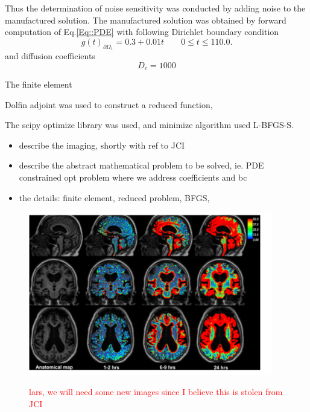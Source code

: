 \documentclass[11pt,a4paper]{article}
\renewcommand{\comment}[1]{\textcolor{red}{#1}}
\begin{document}
Thus the determination of noise sensitivity was conducted by adding noise to the manufactured solution. The manufactured solution was obtained by forward computation of Eq.\ref{Eq::PDE} with following Dirichlet boundary condition
\begin{equation}
g(t)_{\partial \Omega_1} = 0.3 + 0.01t  \qquad  0 \leq t \leq 110.0.
\end{equation}
and diffusion coefficients 
\begin{equation}
D_c = 1000 
\end{equation}  




























The finite element 



Dolfin adjoint was used to construct a reduced function, 

The scipy optimize library was used, and minimize algorithm used L-BFGS-S.  



\begin{itemize}
\item describe the imaging, shortly with ref to JCI  
\item describe the abstract mathematical problem to be solved, ie. PDE constrained opt problem where we 
address coefficients and bc  
\item the details: finite element, reduced problem, BFGS,  
\end{itemize}

\begin{figure}
\includegraphics[width=0.95\textwidth]{GMRI.png} 
\label{fig1} 
\caption{\comment{lars, we will need some new images since I believe this is stolen from JCI}}
\end{figure}
\end{document}
